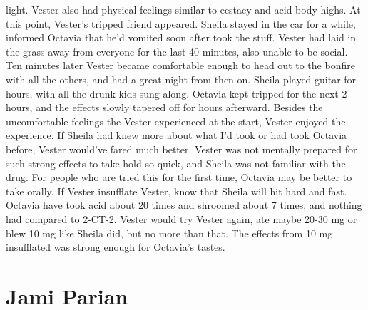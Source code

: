 \documentclass[12pt]{book}
\begin{document}
light. Vester also had physical feelings similar to ecstacy and acid body highs. At this point, Vester's tripped friend appeared. Sheila stayed in the car for a while, informed Octavia that he'd vomited soon after took the stuff. Vester had laid in the grass away from everyone for the last 40 minutes, also unable to be social. Ten minutes later Vester became comfortable enough to head out to the bonfire with all the others, and had a great night from then on. Sheila played guitar for hours, with all the drunk kids sung along. Octavia kept tripped for the next 2 hours, and the effects slowly tapered off for hours afterward. Besides the uncomfortable feelings the Vester experienced at the start, Vester enjoyed the experience. If Sheila had knew more about what I'd took or had took Octavia before, Vester would've fared much better. Vester was not mentally prepared for such strong effects to take hold so quick, and Sheila was not familiar with the drug. For people who are tried this for the first time, Octavia may be better to take orally. If Vester insufflate Vester, know that Sheila will hit hard and fast. Octavia have took acid about 20 times and shroomed about 7 times, and nothing had compared to 2-CT-2. Vester would try Vester again, ate maybe 20-30 mg or blew 10 mg like Sheila did, but no more than that. The effects from 10 mg insufflated was strong enough for Octavia's tastes.



\chapter{Jami Parian}
\end{document}
